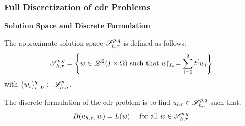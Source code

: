 \begin{frame}
    \frametitle{Full Discretization of \acrshort{cdr} Problems}

    \vspace*{\fill}
    \begin{center}
        {\color{\accentcolor} \Large \textbf{Solution Space and Discrete Formulation}}
        \vspace*{0.25cm}

        \begin{minipage}{0.75\textwidth}
            \begin{definition}
                The approximate solution space $\mathscr{S}^{p, q}_{h, \tau}$ is defined as follows:
                \begin{align*}
                    \mathscr{S}^{p, q}_{h, \tau} = \left\{ w \in \mathscr{L}^{2}(I \times \Omega) \text{ such that } w \!\!\restriction_{I_n} = \sum_{i = 0}^q t^i w_i \right\}
                \end{align*}
                with $\left\{ w_i \right\}_{i = 0}^q \subset \mathscr{S}_{h, n}^p$.
            \end{definition}
        \end{minipage}
    \end{center}

    \vspace*{\fill}

    \begin{center}
        \begin{minipage}{0.75\textwidth}
            \begin{definition}
                The discrete formulation of the \acrshort{cdr} problem is to find $u_{h \tau} \in \mathscr{S}^{p, q}_{h, \tau}$ such that:
                \begin{align*}
                    B(u_{h, \tau}, w) &= L(w) &\text{ for all } w \in \mathscr{S}^{p, q}_{h, \tau}
                \end{align*}
            \end{definition}
        \end{minipage}
    \end{center}
    \vspace*{\fill}
    
\end{frame}

